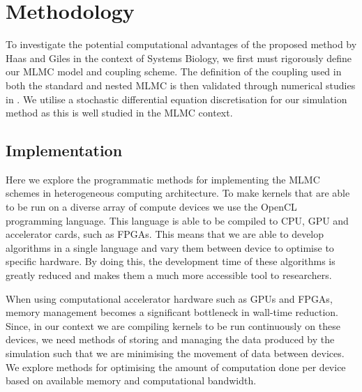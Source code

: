\section{Methodology}\label{sec:methodology}
To investigate the potential computational advantages of the proposed method by Haas and Giles in the context of Systems Biology, we first must rigorously define our MLMC model and coupling scheme. The definition of the coupling used in both the standard and nested MLMC is then validated through numerical studies in . We utilise a stochastic differential equation discretisation for our simulation method as this is well studied in the MLMC context.









\subsection{Implementation}
Here we explore the programmatic methods for implementing the MLMC schemes in heterogeneous computing architecture. To make kernels that are able to be run on a diverse array of compute devices we use the OpenCL programming language. This language is able to be compiled to CPU, GPU and accelerator cards, such as FPGAs. This means that we are able to develop algorithms in a single language and vary them between device to optimise to specific hardware. By doing this, the development time of these algorithms is greatly reduced and makes them a much more accessible tool to researchers.

When using computational accelerator hardware such as GPUs and FPGAs, memory management becomes a significant bottleneck in wall-time reduction. Since, in our context we are compiling kernels to be run continuously on these devices, we need methods of storing and managing the data produced by the simulation such that we are minimising the movement of data between devices. We explore methods for optimising the amount of computation done per device based on available memory and computational bandwidth. 







